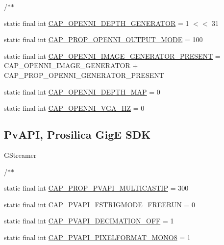 /$\ast$$\ast$ \begin{DoxyCompactItemize}
\item 
static final int \hyperlink{group__videoio__flags__others_gae3c0e63f05b21774fe01e3e9f737e8a0}{C\+A\+P\+\_\+\+O\+P\+E\+N\+N\+I\+\_\+\+D\+E\+P\+T\+H\+\_\+\+G\+E\+N\+E\+R\+A\+T\+OR} = 1 $<$$<$ 31
\item 
static final int \hyperlink{group__videoio__flags__others_gac9fa35868d2fa304aee7d72f50bc9dae}{C\+A\+P\+\_\+\+P\+R\+O\+P\+\_\+\+O\+P\+E\+N\+N\+I\+\_\+\+O\+U\+T\+P\+U\+T\+\_\+\+M\+O\+DE} = 100
\item 
static final int \hyperlink{group__videoio__flags__others_ga94fffc0304ea99800662b4a89e79898e}{C\+A\+P\+\_\+\+O\+P\+E\+N\+N\+I\+\_\+\+I\+M\+A\+G\+E\+\_\+\+G\+E\+N\+E\+R\+A\+T\+O\+R\+\_\+\+P\+R\+E\+S\+E\+NT} = C\+A\+P\+\_\+\+O\+P\+E\+N\+N\+I\+\_\+\+I\+M\+A\+G\+E\+\_\+\+G\+E\+N\+E\+R\+A\+T\+OR + C\+A\+P\+\_\+\+P\+R\+O\+P\+\_\+\+O\+P\+E\+N\+N\+I\+\_\+\+G\+E\+N\+E\+R\+A\+T\+O\+R\+\_\+\+P\+R\+E\+S\+E\+NT
\item 
static final int \hyperlink{group__videoio__flags__others_ga34a12b8e99e76dfa25af8fed3c199d46}{C\+A\+P\+\_\+\+O\+P\+E\+N\+N\+I\+\_\+\+D\+E\+P\+T\+H\+\_\+\+M\+AP} = 0
\item 
static final int \hyperlink{group__videoio__flags__others_gab75d47d5fe56c9248b689bf463a5c96b}{C\+A\+P\+\_\+\+O\+P\+E\+N\+N\+I\+\_\+\+V\+G\+A\+\_\+HZ} = 0
\end{DoxyCompactItemize}
\subsection*{Pv\+A\+PI, Prosilica GigE S\+DK}
\label{_amgrpad73e9ceb7c1dc02527eb584e89bd615}%
 G\+Streamer 

/$\ast$$\ast$ \begin{DoxyCompactItemize}
\item 
static final int \hyperlink{group__videoio__flags__others_gae525c9cc0da137af131406ca12fd92d7}{C\+A\+P\+\_\+\+P\+R\+O\+P\+\_\+\+P\+V\+A\+P\+I\+\_\+\+M\+U\+L\+T\+I\+C\+A\+S\+T\+IP} = 300
\item 
static final int \hyperlink{group__videoio__flags__others_ga013dd4a15cafb63c7a4934abce8aaeb7}{C\+A\+P\+\_\+\+P\+V\+A\+P\+I\+\_\+\+F\+S\+T\+R\+I\+G\+M\+O\+D\+E\+\_\+\+F\+R\+E\+E\+R\+UN} = 0
\item 
static final int \hyperlink{group__videoio__flags__others_gadc78e206f0eea9da651ff0c67a8d4f4c}{C\+A\+P\+\_\+\+P\+V\+A\+P\+I\+\_\+\+D\+E\+C\+I\+M\+A\+T\+I\+O\+N\+\_\+\+O\+FF} = 1
\item 
static final int \hyperlink{group__videoio__flags__others_ga1dfffd05aca0c220f753ce014bdeea0f}{C\+A\+P\+\_\+\+P\+V\+A\+P\+I\+\_\+\+P\+I\+X\+E\+L\+F\+O\+R\+M\+A\+T\+\_\+\+M\+O\+N\+O8} = 1
\end{DoxyCompactItemize}
